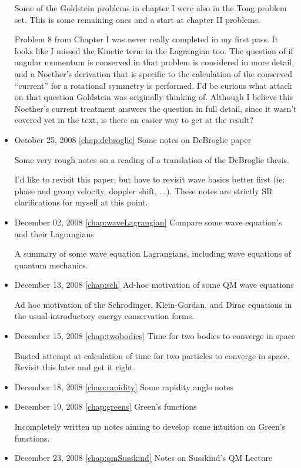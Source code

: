 \begin{itemize}
Some of the Goldstein problems in chapter I were also in the Tong problem set. This is some remaining ones and a start at chapter II problems.

Problem 8 from Chapter I was never really completed in my first pass.  It looks like I missed the Kinetic term in the Lagrangian too.  The question of if angular momentum is conserved in that problem is considered in more detail, and a Noether's derivation that is specific to the calculation of the conserved ``current'' for a rotational symmetry is performed.  I'd be curious what attack on that question Goldstein was originally thinking of.  Although I believe this Noether's current treatment answers the question in full detail, since it wasn't covered yet in the text, is there an easier way to get at the result?
\item October 25, 2008 \ref{chap:debroglie} Some notes on DeBroglie paper

Some very rough notes on a reading of a translation of the DeBroglie thesis. 

I'd like to revisit this paper, but have to revisit wave basics better first (ie: phase and group velocity, doppler shift, ...).   These notes are strictly SR clarifications for myself at this point.\item December 02, 2008 \ref{chap:waveLagrangian} Compare some wave equation's and their Lagrangians

A summary of some wave equation Lagrangians, including wave equations of quantum mechanics.\item December 13, 2008 \ref{chap:sch} Ad-hoc motivation of some QM wave equations

Ad hoc motivation of the Schrodinger, Klein-Gordan, and Dirac equations in the usual introductory energy conservation forms.\item December 15, 2008 \ref{chap:twobodies} Time for two bodies to converge in space

Busted attempt at calculation of time for two particles to converge in space.  Revisit this later and get it right.\item December 18, 2008 \ref{chap:rapidity} Some rapidity angle notes

\item December 19, 2008 \ref{chap:greens} Green's functions

Incompletely written up notes aiming to develop some intuition on Green's functions.\item December 23, 2008 \ref{chap:qmSusskind} Notes on Susskind's QM Lecture


\end{itemize}
